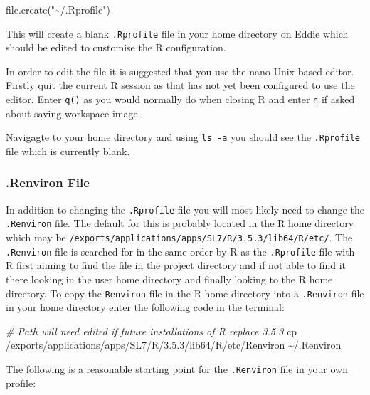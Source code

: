 \documentclass[
]{book}
\newenvironment{Shaded}{\begin{snugshade}}{\end{snugshade}}
\newcommand{\CommentTok}[1]{\textcolor[rgb]{0.56,0.35,0.01}{\textit{#1}}}
\newcommand{\FunctionTok}[1]{\textcolor[rgb]{0.00,0.00,0.00}{#1}}
\newcommand{\NormalTok}[1]{#1}
\newcommand{\StringTok}[1]{\textcolor[rgb]{0.31,0.60,0.02}{#1}}
\begin{document}
\begin{Shaded}
\begin{Highlighting}[]
\FunctionTok{file.create}\NormalTok{(}\StringTok{"\textasciitilde{}/.Rprofile"}\NormalTok{)}
\end{Highlighting}
\end{Shaded}

This will create a blank \texttt{.Rprofile} file in your home directory on Eddie which should be edited to customise the R configuration.

In order to edit the file it is suggested that you use the nano Unix-based editor. Firstly quit the current R session as that has not yet been configured to use the editor. Enter \texttt{q()} as you would normally do when closing R and enter \texttt{n} if asked about saving workspace image.

Navigagte to your home directory and using \texttt{ls\ -a} you should see the \texttt{.Rprofile} file which is currently blank.

\hypertarget{renviron-file}{%
\subsubsection{.Renviron File}\label{renviron-file}}

In addition to changing the \texttt{.Rprofile} file you will most likely need to change the \texttt{.Renviron} file. The default for this is probably located in the R home directory which may be \texttt{/exports/applications/apps/SL7/R/3.5.3/lib64/R/etc/}. The \texttt{.Renviron} file is searched for in the same order by R as the \texttt{.Rprofile} file with R first aiming to find the file in the project directory and if not able to find it there looking in the user home directory and finally looking to the R home directory. To copy the \texttt{Renviron} file in the R home directory into a \texttt{.Renviron} file in your home directory enter the following code in the terminal:

\begin{Shaded}
\begin{Highlighting}[]
\CommentTok{\# Path will need edited if future installations of R replace 3.5.3}
\FunctionTok{cp}\NormalTok{ /exports/applications/apps/SL7/R/3.5.3/lib64/R/etc/Renviron \textasciitilde{}/.Renviron}
\end{Highlighting}
\end{Shaded}

The following is a reasonable starting point for the \texttt{.Renviron} file in your own profile:
\end{document}
